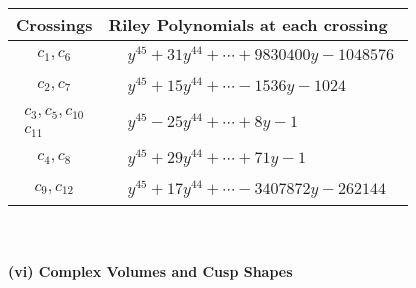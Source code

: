 \documentclass[1p]{elsarticle_modified}
\theoremstyle{definition}
\begin{document}
\begin{tabular}{m{50pt}|m{274pt}}
Crossings & \hspace{64pt}Riley Polynomials at each crossing \\
\hline $$\begin{aligned}c_{1},c_{6}\end{aligned}$$&$\begin{aligned}
&y^{45}+31 y^{44}+\cdots+9830400 y-1048576
\end{aligned}$\\
\hline $$\begin{aligned}c_{2},c_{7}\end{aligned}$$&$\begin{aligned}
&y^{45}+15 y^{44}+\cdots-1536 y-1024
\end{aligned}$\\
\hline $$\begin{aligned}c_{3},c_{5},c_{10}\\c_{11}\end{aligned}$$&$\begin{aligned}
&y^{45}-25 y^{44}+\cdots+8 y-1
\end{aligned}$\\
\hline $$\begin{aligned}c_{4},c_{8}\end{aligned}$$&$\begin{aligned}
&y^{45}+29 y^{44}+\cdots+71 y-1
\end{aligned}$\\
\hline $$\begin{aligned}c_{9},c_{12}\end{aligned}$$&$\begin{aligned}
&y^{45}+17 y^{44}+\cdots-3407872 y-262144
\end{aligned}$\\
\hline
\end{tabular}\\~\\
\newpage\flushleft \textbf{(vi) Complex Volumes and Cusp Shapes}
\end{document}

